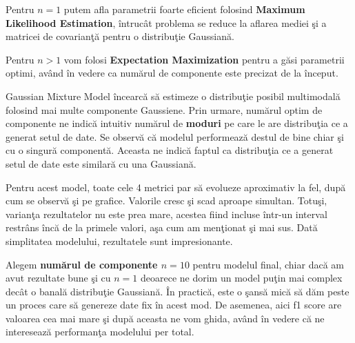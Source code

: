 Pentru $n=1$ putem afla parametrii foarte eficient folosind 
\textbf{Maximum Likelihood Estimation}, întrucât problema 
se reduce la aflarea mediei şi a matricei de 
covarianţă pentru o distribuţie Gaussiană. 

Pentru $n > 1$ vom folosi \textbf{Expectation Maximization} 
pentru a găsi parametrii optimi, 
având în vedere ca numărul de componente este precizat de la început.

Gaussian Mixture Model încearcă să estimeze o distribuţie posibil multimodală 
folosind mai multe componente Gaussiene. Prin urmare, numărul optim de componente
ne indică intuitiv numărul de \textbf{moduri} pe care le are distribuţia ce a generat 
setul de date.
Se observă că modelul performează destul de bine chiar şi cu o singură componentă. 
Aceasta ne indică faptul ca distribuţia ce a generat setul de date este 
similară cu una Gaussiană.

Pentru acest model, toate cele 4 metrici par să evolueze aproximativ la fel, după cum se
observă şi pe grafice. Valorile cresc şi scad aproape simultan. Totuşi, varianţa rezultatelor
nu este prea mare, acestea fiind incluse într-un interval restrâns încă de la primele valori, 
aşa cum am menţionat şi mai sus. Dată simplitatea modelului, rezultatele sunt impresionante.

Alegem \textbf{numărul de componente $n=10$} pentru modelul final, chiar dacă 
am avut rezultate bune şi cu $n=1$ deoarece ne dorim un model puţin mai complex 
decât o banală distribuţie Gaussiană. În practică, este o şansă mică să dăm peste 
un proces care să genereze date fix în acest mod. De asemenea, aici f1 score are valoarea cea mai mare
şi după aceasta ne vom ghida, având în vedere că ne interesează performanţa modelului 
per total.

